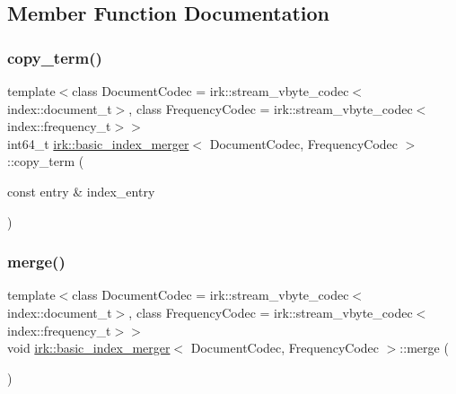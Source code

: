 \subsection{Member Function Documentation}
\mbox{\label{classirk_1_1basic__index__merger_a1c6c4c5bb3b25bd4a843343d96d54b92}} 
\subsubsection{\texorpdfstring{copy\+\_\+term()}{copy\_term()}}
{\footnotesize\ttfamily template$<$class Document\+Codec  = irk\+::stream\+\_\+vbyte\+\_\+codec$<$index\+::document\+\_\+t$>$, class Frequency\+Codec  = irk\+::stream\+\_\+vbyte\+\_\+codec$<$index\+::frequency\+\_\+t$>$$>$ \\
int64\+\_\+t \mbox{\hyperlink{classirk_1_1basic__index__merger}{irk\+::basic\+\_\+index\+\_\+merger}}$<$ Document\+Codec, Frequency\+Codec $>$\+::copy\+\_\+term (\begin{DoxyParamCaption}\item[{const entry \&}]{index\+\_\+entry }\end{DoxyParamCaption})\hspace{0.3cm}{\ttfamily [inline]}}

\mbox{\label{classirk_1_1basic__index__merger_a56e0dfd5c2381fd2fbcd5dd8beaa22d9}} 
\subsubsection{\texorpdfstring{merge()}{merge()}}
{\footnotesize\ttfamily template$<$class Document\+Codec  = irk\+::stream\+\_\+vbyte\+\_\+codec$<$index\+::document\+\_\+t$>$, class Frequency\+Codec  = irk\+::stream\+\_\+vbyte\+\_\+codec$<$index\+::frequency\+\_\+t$>$$>$ \\
void \mbox{\hyperlink{classirk_1_1basic__index__merger}{irk\+::basic\+\_\+index\+\_\+merger}}$<$ Document\+Codec, Frequency\+Codec $>$\+::merge (\begin{DoxyParamCaption}{ }\end{DoxyParamCaption})\hspace{0.3cm}{\ttfamily [inline]}}

